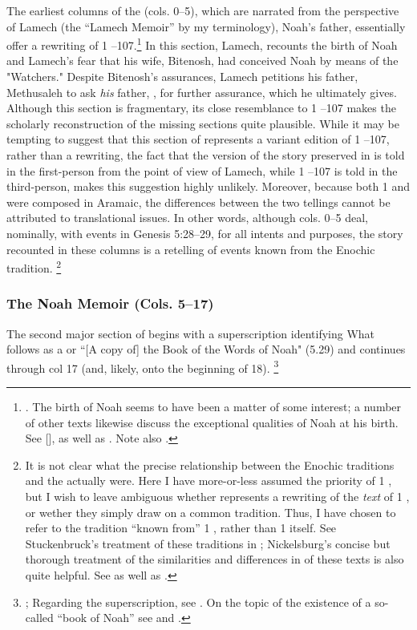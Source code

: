 The earliest columns of the \ga (cols. 0--5), which are narrated from the perspective of Lamech (the ``Lamech Memoir'' by my terminology), Noah's father, essentially offer a rewriting of 1 --107.\footnote{\cite[174]{nickelsburg2005}. The birth of Noah seems to have been a matter of some interest; a number of other texts likewise discuss the exceptional qualities of Noah at his birth. See [],  as well as \cite{vanderkam_kapera1992}. Note also \cite{stuckenbruck_berthelot-etal2010}.} In this section, Lamech, recounts the birth of Noah and Lamech's fear that his wife, Bitenosh, had conceived Noah by means of the  "Watchers." Despite Bitenosh's assurances, Lamech petitions his father, Methusaleh to ask \emph{his} father, \enoch, for further assurance, which he ultimately gives. Although this section is fragmentary, its close resemblance to 1 --107 makes the scholarly reconstruction of the missing sections quite plausible. While it may be tempting to suggest that this section of \ga represents a variant edition of 1 --107, rather than a rewriting, the fact that the version of the story preserved in \ga is told in the first-person from the point of view of Lamech, while 1 --107 is told in the third-person, makes this suggestion highly unlikely. Moreover, because both 1 \enoch and \ga were composed in Aramaic, the differences between the two tellings cannot be attributed to translational issues. In other words, although cols. 0--5 deal, nominally, with events in Genesis 5:28--29, for all intents and purposes, the story recounted in these columns is a retelling of events known from the Enochic tradition.%
%
\footnote{It is not clear what the precise relationship between the Enochic traditions and the \ga actually were. Here I have more-or-less assumed the priority of 1 \enoch, but I wish to leave ambiguous whether \ga represents a rewriting of the \emph{text} of 1 \enoch, or wether they simply draw on a common tradition. Thus, I have chosen to refer to the tradition ``known from'' 1 \enoch, rather than 1 \enoch itself. See Stuckenbruck's treatment of these traditions in \cite*{stuckenbruck_berthelot-etal2010}; Nickelsburg's concise but thorough treatment of the similarities and differences in of these texts is also quite helpful. See \cite[173--174]{nickelsburg2005} as well as \cite[122--123]{fitzmyer2004}.} 


\subsubsection{The Noah Memoir (Cols. 5--17)}
The second major section of \ga begins with a superscription identifying What follows as a  or ``[A copy of] the Book of the Words of Noah" (5.29) and continues through col 17 (and, likely, onto the beginning of 18).%
%
\footnote{\cite[174--175]{nickelsburg2005}; Regarding the superscription, see \cite{steiner_dsd1995}. On the topic of the existence of a so-called ``book of Noah'' see \cite{dimant_vanderkam-etal2006} and \cite{werman_chazon-etal1999}.}

